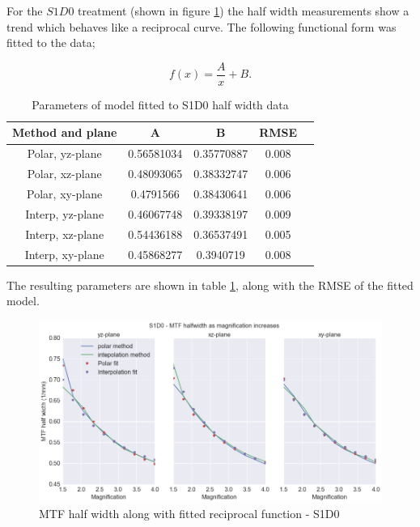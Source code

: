 \documentclass[
  twoside,
  11pt, a4paper,
  footinclude=true,
  headinclude=true,
  cleardoublepage=empty
]{scrbook}
\begin{document}
For the $S1D0$ treatment (shown in figure \ref{S1D0half}) the half width measurements show a trend which behaves like a reciprocal curve. The following functional form was fitted to the data;

\[
f(x) = \frac{A}{x} + B.
\]


\begin{table}
\caption{Parameters of model fitted to S1D0 half width data}
\label{loghalffit}
\begin{tabular}{c|cccc}
\toprule
{} Method and plane &     A &     B   & RMSE\\
\midrule
Polar, yz-plane         &  0.56581034  & 0.35770887  & 0.008\\
Polar, xz-plane        &  0.48093065  & 0.38332747  & 0.006\\
Polar, xy-plane      &  0.4791566   & 0.38430641  & 0.006\\
Interp, yz-plane       &   0.46067748 & 0.39338197  & 0.009\\
Interp, xz-plane       &  0.54436188 & 0.36537491  & 0.005\\
Interp, xy-plane       &  0.45868277 &  0.3940719   & 0.008\\
\bottomrule
\end{tabular}
\end{table}

The resulting parameters are shown in table \ref{loghalffit}, along with the RMSE of the fitted model.



\begin{figure}[h!]
  \centering
    \includegraphics[width=\textwidth]{code/MTF_and_PSF/MTF_Interp_Polar_Plots_files/MTF_Interp_Polar_Plots_8_0.png}
    \caption{MTF half width along with fitted reciprocal function - S1D0}
        \label{S1D0half}
\end{figure}
\end{document}
